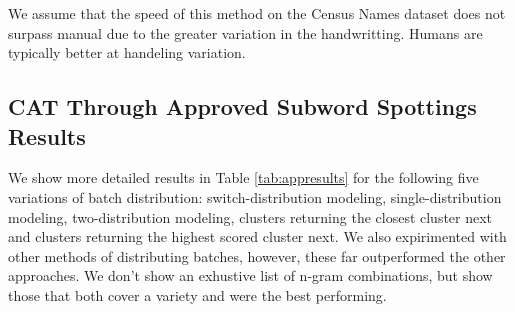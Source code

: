 \documentclass[ms,electronic,twosidetoc,letterpaper,chaptercenter,parttop,lof,lot]{byumsphd}
\begin{document}
We assume that the speed of this method on the Census Names dataset does not surpass manual due to the greater variation in the handwritting. Humans are typically better at handeling variation.

\subsection{CAT Through Approved Subword Spottings Results}

We show more detailed results in Table \ref{tab:appresults} for the following five variations of batch distribution: switch-distribution modeling, single-distribution modeling, two-distribution modeling, clusters returning the closest cluster next and clusters returning the highest scored cluster next. We also expirimented with other methods of distributing batches, however, these far outperformed the other approaches. We don't show an exhustive list of n-gram combinations, but show those that both cover a variety and were the best performing.
\end{document}
